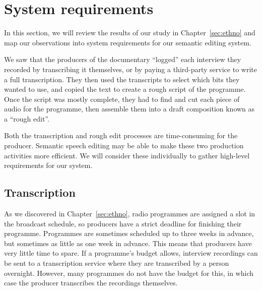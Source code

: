 
\section{System requirements}\label{sec:screen-requirements}


In this section, we will review the results of our study in Chapter~\ref{sec:ethno} and map our observations into
system requirements for our semantic editing system.

We saw that the producers of the documentary ``logged'' each interview they recorded by transcribing it themselves, or
by paying a third-party service to write a full transcription.  They then used the transcripts to select which bits
they wanted to use, and copied the text to create a rough script of the programme. Once the script was mostly complete,
they had to find and cut each piece of audio for the programme, then assemble them into a draft composition known as a
``rough edit''.

Both the transcription and rough edit processes are time-consuming for the producer. Semantic speech
editing may be able to make these two production activities more efficient. We will consider these
individually to gather high-level requirements for our system.

\subsection{Transcription}
As we discovered in Chapter~\ref{sec:ethno}, radio programmes are assigned a slot in the broadcast schedule, so
producers have a strict deadline for finishing their programme. Programmes are sometimes scheduled up to three
weeks in advance, but sometimes as little as one week in advance.  This means that producers have very little time to
spare. If a programme's budget allows, interview recordings can be sent to a transcription service where they are
transcribed by a person overnight. However, many programmes do not have the budget for this, in which case the producer
transcribes the recordings themselves.

